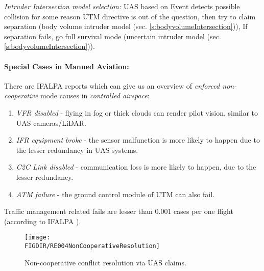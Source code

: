 \begin{note}
    \emph{Intruder Intersection model selection:} UAS based on Event detects possible collision for some reason UTM directive is out of the question, then try to claim separation (body volume intruder model (sec. \ref{s:bodyvolumeIntersection})), If separation fails, go full survival mode (uncertain intruder model (sec. \ref{s:bodyvolumeIntersection})).
\end{note}

\newpage \paragraph{Special Cases in Manned Aviation:} There are IFALPA reports which can give us an overview of \emph{enforced non-cooperative} mode causes in \emph{controlled airspace}:  
\begin{enumerate}
    \item \emph{VFR disabled} - flying in fog or thick clouds can render pilot vision, similar to UAS cameras/LiDAR.
    
    \item \emph{IFR equipment broke} - the sensor malfunction is more likely to happen due to the lesser redundancy in UAS systems.
    
    \item \emph{C2C Link disabled} - communication loss is more likely to happen, due to the lesser redundancy.
    
    \item \emph{ATM failure} - the ground control module of UTM can also fail.
\end{enumerate}

\begin{note}
    Traffic management related fails are lesser than 0.001 cases per one flight (according to IFALPA \cite{subotic2007recovery}).
\end{note}

\begin{figure}[H]
    \centering
    \texttt{[image: \\FIGDIR/RE004NonCooperativeResolution]} 
    \caption{Non-cooperative conflict resolution via UAS claims.}
    \label{fig:NonCooperativeConflictResolutionUTM}
\end{figure}

